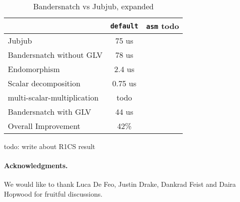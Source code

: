 \documentclass{article}
\newcommand{\ZZ}[1]{\color{cyan}#1\color{black}}
\theoremstyle{definition}
\begin{document}
\begin{table}[h] %
  \centering
  
  \begin{tabular}{|l|c|c|}\hline
      & \texttt{default} & \texttt{asm} \ZZ{todo}\\\hline\hline
    Jubjub & 75 us & \\\hline
    Bandersnatch without GLV & 78 us &  \\\hline\hline   
    Endomorphism & 2.4 us& \\\hline
    Scalar decomposition & 0.75 us & \\\hline
    multi-scalar-multiplication & \ZZ{todo} & \\\hline
    Bandersnatch with GLV& 44 us &  \\\hline\hline
    Overall Improvement & 42\% & \\\hline
  \end{tabular}
  \caption{Bandersnatch vs Jubjub, expanded}
  \label{tab:comp_full}
\end{table}

\ZZ{todo: write about R1CS result}


\bigskip
\paragraph*{\textbf{Acknowledgments.}} We would like to thank Luca De
Feo, Justin Drake, Dankrad Feist and Daira Hopwood for
fruitful discussions.



\end{document}
